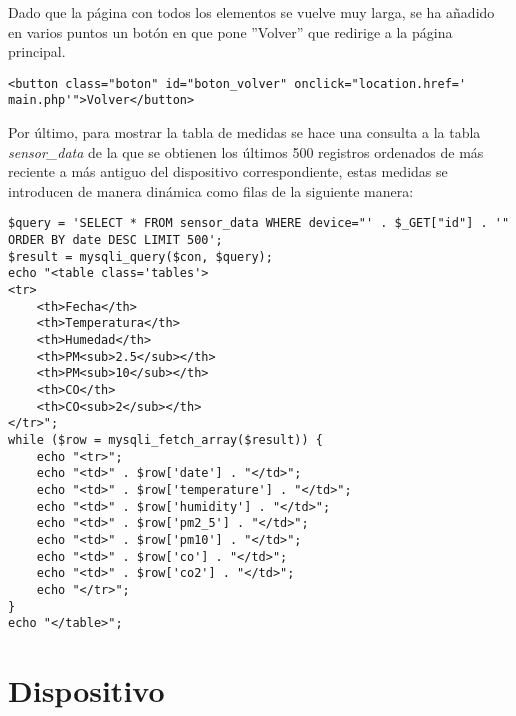 Dado que la página con todos los elementos se vuelve muy larga, se ha añadido en varios puntos un botón en que pone ''Volver'' que redirige a la página principal.
\begin{lstlisting}
<button class="boton" id="boton_volver" onclick="location.href=' main.php'">Volver</button>
\end{lstlisting}

Por último, para mostrar la tabla de medidas se hace una consulta a la tabla \textit{sensor\_data} de la que se obtienen los últimos 500 registros ordenados de más reciente a más antiguo del dispositivo correspondiente, estas medidas se introducen de manera dinámica como filas de la siguiente manera:
\begin{lstlisting}
$query = 'SELECT * FROM sensor_data WHERE device="' . $_GET["id"] . '" ORDER BY date DESC LIMIT 500';
$result = mysqli_query($con, $query);
echo "<table class='tables'>
<tr>
    <th>Fecha</th>
    <th>Temperatura</th>
    <th>Humedad</th>
    <th>PM<sub>2.5</sub></th>
    <th>PM<sub>10</sub></th>
    <th>CO</th>
    <th>CO<sub>2</sub></th>
</tr>";
while ($row = mysqli_fetch_array($result)) {
    echo "<tr>";
    echo "<td>" . $row['date'] . "</td>";
    echo "<td>" . $row['temperature'] . "</td>";
    echo "<td>" . $row['humidity'] . "</td>";
    echo "<td>" . $row['pm2_5'] . "</td>";
    echo "<td>" . $row['pm10'] . "</td>";
    echo "<td>" . $row['co'] . "</td>";
    echo "<td>" . $row['co2'] . "</td>";
    echo "</tr>";
}
echo "</table>";
\end{lstlisting}

\section{Dispositivo}\label{sec:implDispositivo}